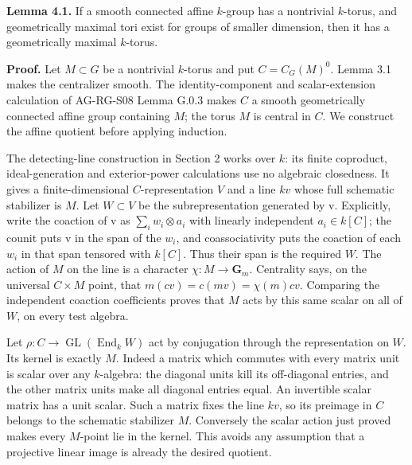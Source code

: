 \documentclass[11pt,a4paper,openany]{report}
\begin{document}
\textbf{Lemma 4.1.} If a smooth connected affine \(k\)-group has a nontrivial \(k\)-torus, and geometrically maximal tori exist for groups of smaller dimension, then it has a geometrically maximal \(k\)-torus.

\textbf{Proof.} Let \(M\subset G\) be a nontrivial \(k\)-torus and put \(C=C_G(M)^0\). Lemma 3.1 makes the centralizer smooth. The identity-component and scalar-extension calculation of AG-RG-S08 Lemma G.0.3 makes \(C\) a smooth geometrically connected affine group containing \(M\); the torus \(M\) is central in \(C\). We construct the affine quotient before applying induction.

The detecting-line construction in Section 2 works over \(k\): its finite coproduct, ideal-generation and exterior-power calculations use no algebraic closedness. It gives a finite-dimensional \(C\)-representation \(V\) and a line \(kv\) whose full schematic stabilizer is \(M\). Let \(W\subset V\) be the subrepresentation generated by v. Explicitly, write the coaction of v as \(\sum_i w_i\otimes a_i\) with linearly independent \(a_i\in k[C]\); the counit puts v in the span of the \(w_i\), and coassociativity puts the coaction of each \(w_i\) in that span tensored with \(k[C]\). Thus their span is the required \(W\). The action of \(M\) on the line is a character \(\chi:M\to\mathbf G_m\). Centrality says, on the universal \(C\times M\) point, that \(m(cv)=c(mv)=\chi(m)cv\). Comparing the independent coaction coefficients proves that \(M\) acts by this same scalar on all of \(W\), on every test algebra.

Let \(\rho:C\to\operatorname{GL}(\operatorname{End}_k W)\) act by conjugation through the representation on \(W\). Its kernel is exactly \(M\). Indeed a matrix which commutes with every matrix unit is scalar over any \(k\)-algebra: the diagonal units kill its off-diagonal entries, and the other matrix units make all diagonal entries equal. An invertible scalar matrix has a unit scalar. Such a matrix fixes the line \(kv\), so its preimage in \(C\) belongs to the schematic stabilizer \(M\). Conversely the scalar action just proved makes every \(M\)-point lie in the kernel. This avoids any assumption that a projective linear image is already the desired quotient.
\end{document}

